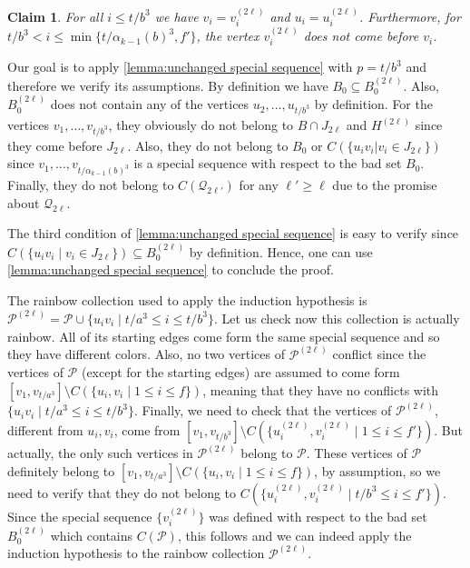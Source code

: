 \documentclass[a4paper,11pt]{article}
\makeatletter
\renewenvironment{proof}[1][\proofname] {\par\pushQED{\qed}\normalfont\topsep6\p@\@plus6\p@\relax\trivlist\item[\hskip\labelsep\bfseries#1\@addpunct{.}]\ignorespaces}{\popQED\endtrivlist\@endpefalse}
\newtheorem{claim}[theorem]{\bf Claim}
\theoremstyle{definition}
\def\cP{\mathcal{P}}
\def\cQ{\mathcal{Q}}
\makeatother
\begin{document}
\begin{proof}
\begin{claim}\label{claim:new special sequence equals old up to J_{2ell}}
For all $i\leq t/b^3$ we have $v_i=v_i^{(2\ell)}$ and $u_i = u_i^{(2\ell)}$. Furthermore, for $t/b^3<i\leq \min\{t/\alpha_{k-1}(b)^3, f'\}$, the vertex $v_i^{(2\ell)}$ does not come before $v_i$. 
\end{claim}
\begin{proof}
Our goal is to apply \cref{lemma:unchanged special sequence} with $p=t/b^3$ and therefore we verify its assumptions. By definition we have $B_0\subseteq B_0^{(2\ell)}$. Also, $B_0^{(2\ell)}$ does not contain any of the vertices $u_2, \dots, u_{t/b^3}$ by definition. For the vertices $v_1, \dots, v_{t/b^3}$, they obviously do not belong to $B\cap J_{2\ell}$ and $H^{(2\ell)}$ since they come before $J_{2\ell}$. Also, they do not belong to $B_0$ or $C(\{u_iv_i|v_i\in J_{2\ell}\})$ since $v_1, \dots, v_{t/\alpha_{k-1}(b)^3}$ is a special sequence with respect to the bad set $B_0$. Finally, they do not belong to $C(\cQ_{2\ell'})$ for any $\ell'\geq \ell$ due to the promise about $\cQ_{2\ell}$. 

The third condition of \cref{lemma:unchanged special sequence} is easy to verify since $C(\{u_iv_i\mid v_i\in J_{2\ell}\})\subseteq B_0^{(2\ell)}$ by definition. Hence, one can use \cref{lemma:unchanged special sequence} to conclude the proof.
\end{proof}

The rainbow collection used to apply the induction hypothesis is $\cP^{(2\ell)}=\cP\cup \{u_iv_i\mid t/a^3\leq i\leq t/b^3\}$. Let us check now this collection is actually rainbow. All of its starting edges come form the same special sequence and so they have different colors. Also, no two vertices of $\cP^{(2\ell)}$ conflict since the vertices of $\cP$ (except for the starting edges) are assumed to come form $[v_1, v_{t/a^3}]\setminus C(\{u_i, v_i\mid 1\leq i\leq f\})$, meaning that they have no conflicts with $\{u_iv_i\mid t/a^3\leq i\leq t/b^3\}$. Finally, we need to check that the vertices of $\cP^{(2\ell)}$, different from $u_i, v_i$, come from $[v_1, v_{t/b^3}]\setminus C(\{u_i^{(2\ell)}, v_i^{(2\ell)}\mid 1\leq i\leq f'\})$. But actually, the only such vertices in $\cP^{(2\ell)}$ belong to $\cP$. These vertices of $\cP$ definitely belong to $[v_1, v_{t/a^3}]\setminus C(\{u_i, v_i\mid 1\leq i\leq f\})$, by assumption, so we need to verify that they do not belong to $C(\{u_i^{(2\ell)}, v_i^{(2\ell)}\mid t/b^3\leq i\leq f'\})$. Since the special sequence $\{v^{(2\ell)}_i\}$ was defined with respect to the bad set $B_0^{(2\ell)}$ which contains $C(\cP)$, this follows and we can indeed apply the induction hypothesis to the rainbow collection $\cP^{(2\ell)}$.


\end{proof}
\end{document}
